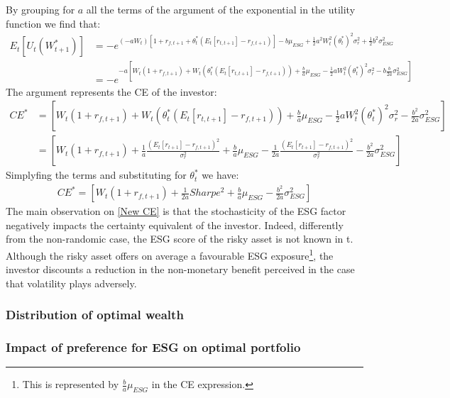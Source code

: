 \documentclass[12pt]{article}
\begin{document}
	By grouping for $a$ all the terms of the argument of the exponential in the utility function we find that:
	\begin{align*}
		E_t[U_{t}(W_{t+1}^{*})] &= -e^{(-aW_t) [1 + r_{f,t+1} + \theta_t^*(E_{t}[r_{t,t+1}]-r_{f, t+1})] - b\mu_{ESG} + \frac{1}{2}a^2W_t^2(\theta_t^*)^2\sigma_r^2 +\frac{1}{2}b^2\sigma_{ESG}^2 } \\
		&= -e^{-a [W_t(1 + r_{f,t+1}) + W_t(\theta_t^*(E_{t}[r_{t,t+1}]-r_{f, t+1})) + \frac{b}{a}\mu_{ESG} - \frac{1}{2}aW_t^2(\theta_t^{*})^2\sigma_r^2 -b\frac{b}{2a}\sigma_{ESG}^2]}
	\end{align*} %
	The argument represents the CE of the investor: 
	\begin{align*}
		CE^* &= [W_t(1 + r_{f,t+1}) + W_t(\theta_t^*(E_{t}[r_{t,t+1}]-r_{f, t+1})) + \frac{b}{a}\mu_{ESG} - \frac{1}{2}aW_t^2(\theta_t^{*})^2\sigma_r^2 -\frac{b^2}{2a}\sigma_{ESG}^2] \\
		&= [W_t(1 + r_{f,t+1}) + \frac{1}{a}\frac{(E_{t}[r_{t+1}]-r_{f, t+1})^2}{\sigma_r^2} + \frac{b}{a}\mu_{ESG} - \frac{1}{2a}\frac{(E_{t}[r_{t+1}]-r_{f, t+1})^2}{\sigma_r^2}-\frac{b^2}{2a}\sigma_{ESG}^2]
	\end{align*}
	Simplyfing the terms and substituting for $\theta_t^{*}$ we have: \vspace{-0.5em}
	\begin{align} \label{New CE}
		CE^* = [W_t(1 + r_{f,t+1}) + \frac{1}{2a}Sharpe^2 + \frac{b}{a}\mu_{ESG} -\frac{b^2}{2a}\sigma_{ESG}^2]
	\end{align} \vspace{-0.5em}
	The main observation on \ref{New CE} is that the stochasticity of the ESG factor negatively impacts the certainty equivalent of the investor. Indeed, differently from the non-randomic case, the ESG score of the risky asset is not known in t.\\ Although the risky asset offers on average a favourable ESG exposure\footnote{This is represented by $\frac{b}{a}\mu_{ESG}$ in the CE expression.}, the investor discounts a reduction in the non-monetary benefit perceived in the case that volatility plays adversely.  
	\subsubsection{Distribution of optimal wealth}
	\subsubsection{Impact of preference for ESG on optimal portfolio}
	
\end{document}

